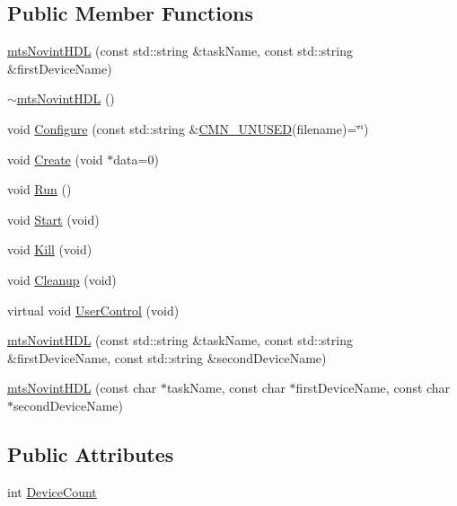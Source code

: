 \subsection*{Public Member Functions}
\begin{DoxyCompactItemize}
\item 
\hyperlink{classmts_novint_h_d_l_a1bf1c724f38544e9b0c58fbf31619e6e}{mts\-Novint\-H\-D\-L} (const std\-::string \&task\-Name, const std\-::string \&first\-Device\-Name)
\item 
\hyperlink{classmts_novint_h_d_l_a75b849be3d5bd239ef7df3f1ec187a74}{$\sim$mts\-Novint\-H\-D\-L} ()
\item 
void \hyperlink{classmts_novint_h_d_l_ab6df53b1e9ab9f557022d60694950c78}{Configure} (const std\-::string \&\hyperlink{cmn_portability_8h_a021894e2626935fa2305434b1e893ff6}{C\-M\-N\-\_\-\-U\-N\-U\-S\-E\-D}(filename)=\char`\"{}\char`\"{})
\item 
void \hyperlink{classmts_novint_h_d_l_ab07ce6cde2e9b851c291f61a1332ca63}{Create} (void $\ast$data=0)
\item 
void \hyperlink{classmts_novint_h_d_l_a95c92d72b00ec707b16f58d464194cf6}{Run} ()
\item 
void \hyperlink{classmts_novint_h_d_l_afec4fe7476f0529bb9bb3c491e220f9c}{Start} (void)
\item 
void \hyperlink{classmts_novint_h_d_l_a1a0ada52f3d96ed663e0f34ebbe0e629}{Kill} (void)
\item 
void \hyperlink{classmts_novint_h_d_l_a2294c634ec80b3fd9c922358e222661d}{Cleanup} (void)
\item 
virtual void \hyperlink{classmts_novint_h_d_l_ac345d2943221ae4239d50fbeb24fde7a}{User\-Control} (void)
\end{DoxyCompactItemize}
{\bf }\par
\begin{DoxyCompactItemize}
\item 
\hyperlink{classmts_novint_h_d_l_aab86717089d85224c9ecc12696ee34e7}{mts\-Novint\-H\-D\-L} (const std\-::string \&task\-Name, const std\-::string \&first\-Device\-Name, const std\-::string \&second\-Device\-Name)
\item 
\hyperlink{classmts_novint_h_d_l_a7081a83693b4cb1053ae63e525536af6}{mts\-Novint\-H\-D\-L} (const char $\ast$task\-Name, const char $\ast$first\-Device\-Name, const char $\ast$second\-Device\-Name)
\end{DoxyCompactItemize}

\subsection*{Public Attributes}
\begin{DoxyCompactItemize}
\item 
int \hyperlink{classmts_novint_h_d_l_a7e7e29f297ded7d1c14a92fab0df7ca0}{Device\-Count}
\end{DoxyCompactItemize}

